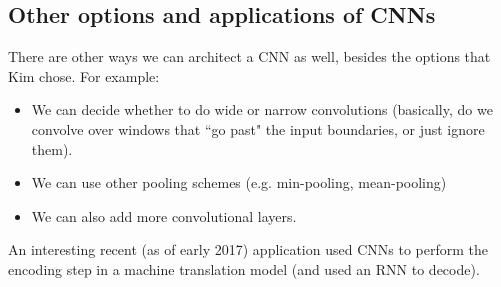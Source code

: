 \subsection{Other options and applications of CNNs}
There are other ways we can architect a CNN as well, besides the options that Kim chose. For example:
\begin{itemize}
\item We can decide whether to do wide or narrow convolutions (basically, do we convolve over windows that ``go past" the input boundaries, or just ignore them).
\item We can use other pooling schemes (e.g. min-pooling, mean-pooling)
\item We can also add more convolutional layers.
\end{itemize}
An interesting recent (as of early 2017) application used CNNs to perform the encoding step in a machine translation model (and used an RNN to decode).
